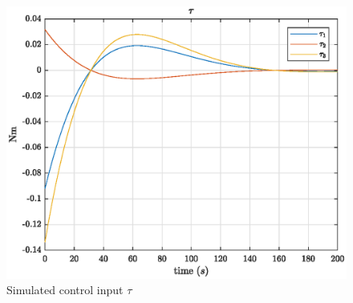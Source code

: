 \begin{figure}[h!]
    \centering
    \includegraphics[scale=0.90]{tau1.eps}
    \caption{Simulated control input $\tau$ }
    \label{fig:tau1}
\end{figure}
